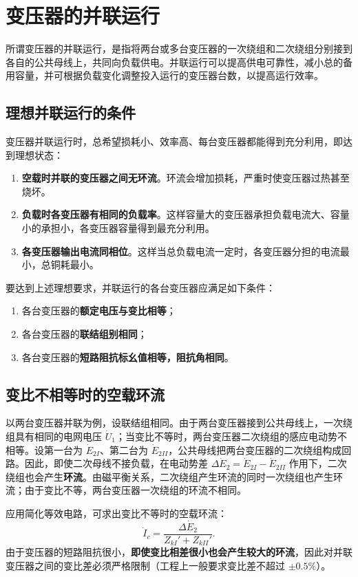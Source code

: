 \section{变压器的并联运行}

所谓变压器的并联运行，是指将两台或多台变压器的一次绕组和二次绕组分别接到各自的公共母线上，共同向负载供电。并联运行可以提高供电可靠性，减小总的备用容量，并可根据负载变化调整投入运行的变压器台数，以提高运行效率。

\subsection{理想并联运行的条件}
变压器并联运行时，总希望损耗小、效率高、每台变压器都能得到充分利用，即达到理想状态：
\begin{enumerate}
  \item \textbf{空载时并联的变压器之间无环流}。环流会增加损耗，严重时使变压器过热甚至烧坏。
  \item \textbf{负载时各变压器有相同的负载率}。这样容量大的变压器承担负载电流大、容量小的承担小，各变压器容量得到最充分利用。
  \item \textbf{各变压器输出电流同相位}。这样当总负载电流一定时，各变压器分担的电流最小，总铜耗最小。
\end{enumerate}

要达到上述理想要求，并联运行的各台变压器应满足如下条件：
\begin{enumerate}
  \item 各台变压器的\textbf{额定电压与变比相等}；
  \item 各台变压器的\textbf{联结组别相同}；
  \item 各台变压器的\textbf{短路阻抗标幺值相等，阻抗角相同}。
\end{enumerate}

\subsection{变比不相等时的空载环流}
以两台变压器并联为例，设联结组相同。由于两台变压器接到公共母线上，一次绕组具有相同的电网电压 $\dot U_1$；当变比不等时，两台变压器二次绕组的感应电动势不相等。设第一台为 $\dot E_{2I}$、第二台为 $\dot E_{2II}$，公共母线把两台变压器的二次绕组构成回路。因此，即使二次母线不接负载，在电动势差 $\Delta\dot E_2=\dot E_{2I}-\dot E_{2II}$ 作用下，二次绕组也会产生\textbf{环流}。由磁平衡关系，二次绕组产生环流的同时一次绕组也产生环流；由于变比不等，两台变压器一次绕组的环流不相同。

应用简化等效电路，可求出变比不等时的空载环流：
\begin{equation}
\dot I_c=\frac{\Delta\dot E_2}{Z_{kI}'+Z_{kII}'} .
\end{equation}
由于变压器的短路阻抗很小，\textbf{即使变比相差很小也会产生较大的环流}，因此对并联变压器之间的变比差必须严格限制（工程上一般要求变比差不超过 $\pm0.5\%$）。

